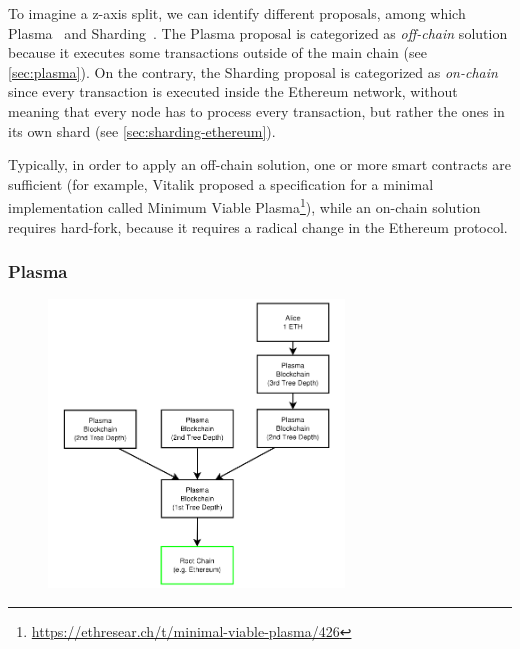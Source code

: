 To imagine a z-axis split, we can identify different proposals, among which
Plasma~\cite{poon2017plasma} and Sharding~\cite{bib:mauve, bib:sharding-faq}.
The Plasma proposal is categorized as \emph{off-chain} solution because it
executes some transactions outside of the main chain (see \autoref{sec:plasma}).
On the contrary, the Sharding proposal is categorized as \emph{on-chain} since
every transaction is executed inside the Ethereum network, without meaning that
every node has to process every transaction, but rather the ones in its own
shard (see \autoref{sec:sharding-ethereum}).

Typically, in order to apply an off-chain solution, one or more smart
contracts are sufficient (for example, Vitalik proposed a specification for a
minimal implementation called Minimum Viable
Plasma\footnote{\url{https://ethresear.ch/t/minimal-viable-plasma/426}}), while
an on-chain solution requires hard-fork, because it requires a radical change in
the Ethereum protocol.

\subsubsection{Plasma}
\label{sec:plasma}

\begin{figure}[t]
    \begin{center}
        \includegraphics[width=0.7\textwidth]{./res/img/plasma}
        \label{fig:plasma}
    \end{center}
\end{figure}

